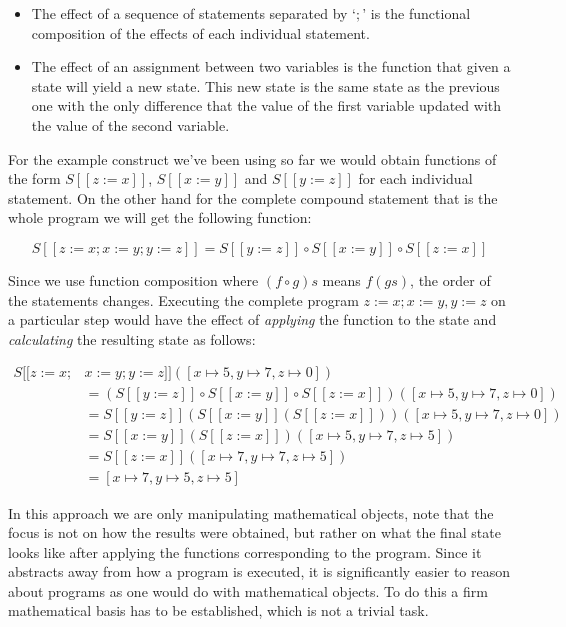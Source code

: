 \begin{itemize}
\item{The effect of a sequence of statements separated by `$;$' is the functional composition of the effects of each individual statement.}
\item{The effect of an assignment between two variables is the function that given a state will yield a new state.
This new state is the same state as the previous one with the only difference that the value of the first variable updated with the value of the second variable.}
\end{itemize}

For the example construct we've been using so far we would obtain functions of the form $S [\![ z:=x ]\!]$, $S [\![ x:=y ]\!]$ and $S [\![ y:=z ]\!]$ for each individual statement.
On the other hand for the complete compound statement that is the whole program we will get the following function:

\begin{equation*}
S [\![ z:=x; x:=y; y:=z ]\!] = S [\![ y:=z ]\!] \circ S [\![ x:=y ]\!] \circ S [\![ z:=x ]\!]
\end{equation*}

Since we use function composition where $(f \circ g) s$ means $f(g s)$, the order of the statements changes.
Executing the complete program $z:=x; x:=y, y:=z$ on a particular step would have the effect of \textit{applying} the function to the state and \textit{calculating} the resulting state as follows:

\begin{align*}
S [\![ z:=x; & x:=y; y:=z ]\!]([x\mapsto5, y\mapsto7, z\mapsto0])\\
&= (S [\![ y:=z ]\!] \circ S [\![ x:=y ]\!] \circ S [\![ z:=x ]\!])([x\mapsto5, y\mapsto7, z\mapsto0])\\
&= S [\![ y:=z ]\!](S [\![ x:=y ]\!] (S [\![ z:=x ]\!]))([x\mapsto5, y\mapsto7, z\mapsto0])\\
&= S [\![ x:=y ]\!] (S [\![ z:=x ]\!])([x\mapsto5, y\mapsto7, z\mapsto5])\\
&= S [\![ z:=x ]\!]([x\mapsto7, y\mapsto7, z\mapsto5])\\
&= [x\mapsto7, y\mapsto5, z\mapsto5]
\end{align*}

In this approach we are only manipulating mathematical objects, note that the focus is not on how the results were obtained, but rather on what the final state looks like after applying the functions corresponding to the program.
Since it abstracts away from how a program is executed, it is significantly easier to reason about programs as one would do with mathematical objects.
To do this a firm mathematical basis has to be established, which is not a trivial task.

